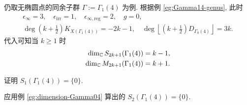 \begin{example}\label{eg:dimension-Gamma14-odd}
	仍取无椭圆点的同余子群 $\Gamma := \Gamma_1(4)$ 为例. 根据例 \ref{eg:Gamma14-genus}, 此时
	\begin{gather*}
		\epsilon_\infty = 3, \quad \epsilon_{\mathrm{irr}} = 1, \quad \epsilon_{\infty, \mathrm{reg}} = 2, \quad g = 0, \\
		\deg \left(k + \frac{1}{2}\right) K_{X(\Gamma_1(4))} = -2k - 1, \quad \deg \left\lfloor \left(k + \frac{1}{2}\right) D_{\Gamma_0(4)} \right\rfloor = 3k.
	\end{gather*}
	代入可知当 $k \geq 1$ 时
	\begin{align*}
		\dim_{\mathbb{C}} S_{2k+1}(\Gamma_1(4)) & = k - 1, \\
		\dim_{\mathbb{C}} M_{2k+1}(\Gamma_1(4)) & = k + 1.
	\end{align*}
\end{example}

\begin{exercise}
	证明 $S_1(\Gamma_1(4)) = \{0\}$.

	\begin{hint}
		应用例 \ref{eg:dimension-Gamma04} 算出的 $S_2(\Gamma_1(4)) = \{0\}$.
	\end{hint}
\end{exercise}
